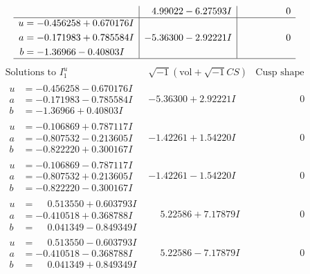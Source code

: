 \documentclass[1p]{elsarticle_modified}
\theoremstyle{definition}
\newcommand{\I}{\sqrt{-1}}
\begin{document}
$$\begin{array}{c|c|c}
 & \phantom{-}4.99022 - 6.27593 I & \phantom{-0.000000 } 0 \\ \hline\begin{aligned}
u &= -0.456258 + 0.670176 I \\
a &= -0.171983 + 0.785584 I \\
b &= -1.36966 - 0.40803 I\end{aligned}
 & -5.36300 - 2.92221 I & \phantom{-0.000000 } 0\\
 \hline 
 \end{array}$$\newpage$$\begin{array}{c|c|c}  
\text{Solutions to }I^u_{1}& \I (\text{vol} + \sqrt{-1}CS) & \text{Cusp shape}\\
 \hline 
\begin{aligned}
u &= -0.456258 - 0.670176 I \\
a &= -0.171983 - 0.785584 I \\
b &= -1.36966 + 0.40803 I\end{aligned}
 & -5.36300 + 2.92221 I & \phantom{-0.000000 } 0 \\ \hline\begin{aligned}
u &= -0.106869 + 0.787117 I \\
a &= -0.807532 - 0.213605 I \\
b &= -0.822220 + 0.300167 I\end{aligned}
 & -1.42261 + 1.54220 I & \phantom{-0.000000 } 0 \\ \hline\begin{aligned}
u &= -0.106869 - 0.787117 I \\
a &= -0.807532 + 0.213605 I \\
b &= -0.822220 - 0.300167 I\end{aligned}
 & -1.42261 - 1.54220 I & \phantom{-0.000000 } 0 \\ \hline\begin{aligned}
u &= \phantom{-}0.513550 + 0.603793 I \\
a &= -0.410518 + 0.368788 I \\
b &= \phantom{-}0.041349 - 0.849349 I\end{aligned}
 & \phantom{-}5.22586 + 7.17879 I & \phantom{-0.000000 } 0 \\ \hline\begin{aligned}
u &= \phantom{-}0.513550 - 0.603793 I \\
a &= -0.410518 - 0.368788 I \\
b &= \phantom{-}0.041349 + 0.849349 I\end{aligned}
 & \phantom{-}5.22586 - 7.17879 I & \phantom{-0.000000 } 0 \\ \hline\begin{aligned}

\end{aligned}
\end{array}$$
\end{document}
